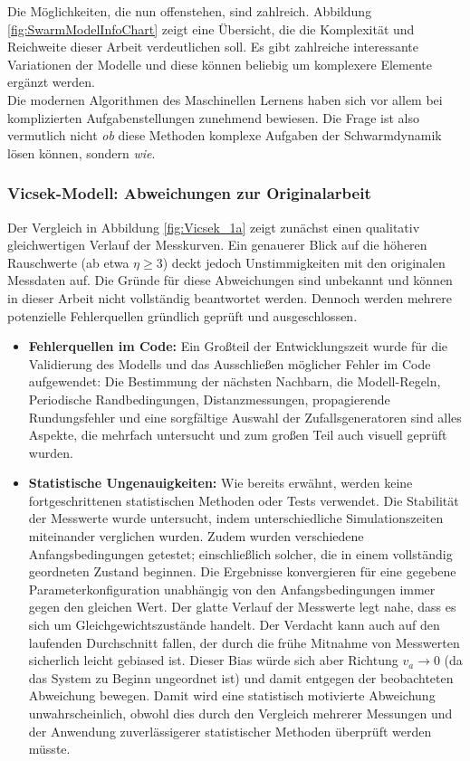 \documentclass{solutionclass}
\begin{document}
Die Möglichkeiten, die nun offenstehen, sind zahlreich. Abbildung \ref{fig:SwarmModelInfoChart} zeigt eine Übersicht, die die Komplexität und Reichweite dieser Arbeit verdeutlichen soll. Es gibt zahlreiche interessante Variationen der Modelle und diese können beliebig um komplexere Elemente ergänzt werden.\\

Die modernen Algorithmen des Maschinellen Lernens haben sich vor allem bei komplizierten Aufgabenstellungen zunehmend bewiesen. Die Frage ist also vermutlich nicht \textit{ob} diese Methoden komplexe Aufgaben der Schwarmdynamik lösen können, sondern \textit{wie}.

\subsubsection*{Vicsek-Modell: Abweichungen zur Originalarbeit}

Der Vergleich in Abbildung \ref{fig:Vicsek_1a} zeigt zunächst einen qualitativ gleichwertigen Verlauf der Messkurven. Ein genauerer Blick auf die höheren Rauschwerte (ab etwa $\eta \geq 3$) deckt jedoch Unstimmigkeiten mit den originalen Messdaten auf. Die Gründe für diese Abweichungen sind unbekannt und können in dieser Arbeit nicht vollständig beantwortet werden. Dennoch werden mehrere potenzielle Fehlerquellen gründlich geprüft und ausgeschlossen.\\

\begin{itemize}
    \item \textbf{Fehlerquellen im Code:} Ein Großteil der Entwicklungszeit wurde für die Validierung des Modells und das Ausschließen möglicher Fehler im Code aufgewendet: Die Bestimmung der nächsten Nachbarn, die Modell-Regeln, Periodische Randbedingungen, Distanzmessungen, propagierende Rundungsfehler und eine sorgfältige Auswahl der Zufallsgeneratoren sind alles Aspekte, die mehrfach untersucht und zum großen Teil auch visuell geprüft wurden.
    \item \textbf{Statistische Ungenauigkeiten:} Wie bereits erwähnt, werden keine fortgeschrittenen statistischen Methoden oder Tests verwendet. Die Stabilität der Messwerte wurde untersucht, indem unterschiedliche Simulationszeiten miteinander verglichen wurden. Zudem wurden verschiedene Anfangsbedingungen getestet; einschließlich solcher, die in einem vollständig geordneten Zustand beginnen. Die Ergebnisse konvergieren für eine gegebene Parameterkonfiguration unabhängig von den Anfangsbedingungen immer gegen den gleichen Wert. Der glatte Verlauf der Messwerte legt nahe, dass es sich um Gleichgewichtszustände handelt.
    Der Verdacht kann auch auf den laufenden Durchschnitt fallen, der durch die frühe Mitnahme von Messwerten sicherlich leicht gebiased ist. Dieser Bias würde sich aber Richtung $v_a \rightarrow 0$ (da das System zu Beginn ungeordnet ist) und damit entgegen der beobachteten Abweichung bewegen. Damit wird eine statistisch motivierte Abweichung unwahrscheinlich, obwohl dies durch den Vergleich mehrerer Messungen und der Anwendung zuverlässigerer statistischer Methoden überprüft werden müsste.
\end{itemize}
\end{document}

